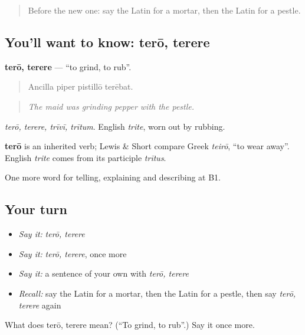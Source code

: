\label{lesson:LA-C351-tero}



\begin{quote}
Before the new one: say the Latin for a mortar, then the Latin for a pestle.
\end{quote}

\subsection*{You'll want to know: terō, terere}
\textbf{terō, terere} — \textquotedblleft{}to grind, to rub\textquotedblright{}.

\begin{quote}
Ancilla piper pistillō terēbat.
\end{quote}

\begin{quote}
\emph{The maid was grinding pepper with the pestle.}
\end{quote}

\emph{terō, terere, trīvī, trītum}. English \emph{trite}, worn out by rubbing.

\begin{cousinweb}
\textbf{terō} is an inherited verb; Lewis \& Short compare Greek \emph{teirō}, \textquotedblleft{}to wear away\textquotedblright{}. English \emph{trite} comes from its participle \emph{trītus}.
\end{cousinweb}

\begin{grammarlens}[title={What you've built}]
One more word for telling, explaining and describing at B1.
\end{grammarlens}

\subsection*{Your turn}
\begin{itemize}
\raggedright
  \item \emph{Say it:} \emph{terō, terere}
  \item \emph{Say it:} \emph{terō, terere}, once more
  \item \emph{Say it:} a sentence of your own with \emph{terō, terere}
  \item \emph{Recall:} say the Latin for a mortar, then the Latin for a pestle, then say \emph{terō, terere} again
\end{itemize}

\begin{tcolorbox}[breakable,colback=teal!4,colframe=teal!35!black,title={Before you move on}]
What does terō, terere mean? (\textquotedblleft{}To grind, to rub\textquotedblright{}.) Say it once more.
\end{tcolorbox}
